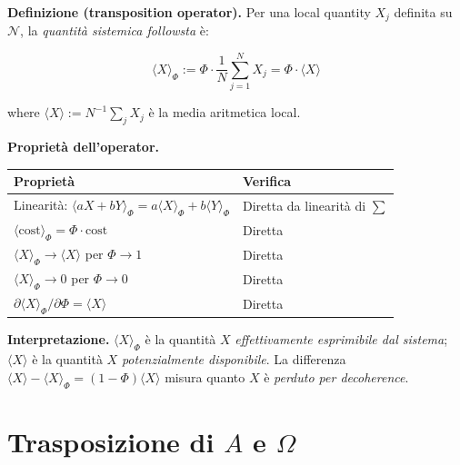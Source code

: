 \Hypoth{} \textbf{Definizione (transposition operator).} Per una
local quantity \(X_j\) definita su \(\mathcal{N}\), la \emph{quantità
sistemica followsta} è:

\[
\langle X \rangle_\Phi := \Phi \cdot \frac{1}{N} \sum_{j=1}^{N} X_j = \Phi \cdot \langle X \rangle
\]

where \(\langle X \rangle := N^{-1} \sum_j X_j\) è la media aritmetica
local.

\Proved{} \textbf{Proprietà dell'operator.}

{\def\LTcaptype{none} %
{\small\begin{longtable}[]{@{}
  >{\raggedright\arraybackslash}p{}
  >{\raggedright\arraybackslash}p{}@{}}
\toprule\noalign{}
\begin{minipage}[b]{\linewidth}\raggedright
Proprietà
\end{minipage} & \begin{minipage}[b]{\linewidth}\raggedright
Verifica
\end{minipage} \\
\midrule\noalign{}
\endhead
\bottomrule\noalign{}
\endlastfoot
Linearità:
\(\langle aX + bY \rangle_\Phi = a\langle X\rangle_\Phi + b\langle Y\rangle_\Phi\)
& Diretta da linearità di \(\sum\) \\
\(\langle\text{cost}\rangle_\Phi = \Phi \cdot \text{cost}\) & Diretta \\
\(\langle X \rangle_\Phi \to \langle X \rangle\) per \(\Phi \to 1\) &
Diretta \\
\(\langle X \rangle_\Phi \to 0\) per \(\Phi \to 0\) & Diretta \\
\(\partial \langle X \rangle_\Phi / \partial \Phi = \langle X \rangle\)
& Diretta \\
\end{longtable}}
}

\Hypoth{} \textbf{Interpretazione.} \(\langle X \rangle_\Phi\) è la
quantità \(X\) \emph{effettivamente esprimibile dal sistema};
\(\langle X \rangle\) è la quantità \(X\) \emph{potenzialmente
disponibile}. La differenza
\(\langle X \rangle - \langle X \rangle_\Phi = (1-\Phi)\langle X \rangle\)
misura quanto \(X\) è \emph{perduto per decoherence}.



\section{\texorpdfstring{Trasposizione di \(A\) e
\(\Omega\)}{Trasposizione di A e \textbackslash Omega}}\label{trasposizione-di-a-e-omega}

